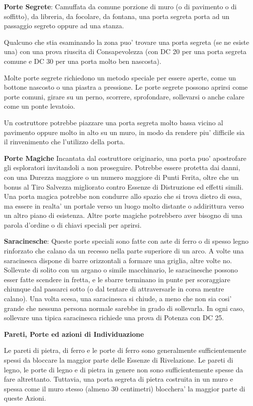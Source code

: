 \documentclass[a4paper,11pt,twoside,openany]{dndbook}
\begin{document}
{\textbf{Porte Segrete}: Camuffata da comune porzione di muro (o di pavimento o di soffitto), da libreria, da focolare, da fontana, una porta segreta porta ad un passaggio segreto oppure ad una stanza.

Qualcuno che stia esaminando la zona puo' trovare una porta segreta (se ne esiste una) con una prova riuscita di Consapevolezza (con DC 20 per una porta segreta comune e DC 30 per una porta molto ben nascosta).

Molte porte segrete richiedono un metodo speciale per essere aperte, come un bottone nascosto o una piastra a pressione. Le porte segrete possono aprirsi come porte comuni, girare su un perno, scorrere, sprofondare, sollevarsi o anche calare come un ponte levatoio.

Un costruttore potrebbe piazzare una porta segreta molto bassa vicino al pavimento oppure molto in alto su un muro, in modo da rendere piu' difficile sia il rinvenimento che l'utilizzo della porta.

\textbf{Porte Magiche} Incantata dal costruttore originario, una porta puo' apostrofare gli esploratori invitandoli a non proseguire. Potrebbe essere protetta dai danni, con una Durezza maggiore o un numero maggiore di Punti Ferita, oltre che un bonus al Tiro Salvezza migliorato contro Essenze di Distruzione ed effetti simili. Una porta magica potrebbe non condurre allo spazio che si trova dietro di essa, ma essere in realta' un portale verso un luogo molto distante o addirittura verso un altro piano di esistenza. Altre porte magiche potrebbero aver bisogno di una parola d'ordine o di chiavi speciali per aprirsi.

\textbf{Saracinesche}: Queste porte speciali sono fatte con aste di ferro o di spesso legno rinforzato che calano da un recesso nella parte superiore di un arco. A volte una saracinesca dispone di barre orizzontali a formare una griglia, altre volte no. Sollevate di solito con un argano o simile macchinario, le saracinesche possono esser fatte scendere in fretta, e le sbarre terminano in punte per scoraggiare chiunque dal passarci sotto (o dal tentare di attraversarle in corsa mentre calano). Una volta scesa, una saracinesca si chiude, a meno che non sia cosi' grande che nessuna persona normale sarebbe in grado di sollevarla. In ogni caso, sollevare una tipica saracinesca richiede una prova di Potenza con DC 25.

\textbf{Pareti, Porte ed azioni di Individuazione}

Le pareti di pietra, di ferro e le porte di ferro sono generalmente sufficientemente spessi da bloccare la maggior parte delle Essenze di Rivelazione. Le pareti di legno, le porte di legno e di pietra in genere non sono sufficientemente spesse da fare altrettanto. Tuttavia, una porta segreta di pietra costruita in un muro e spessa come il muro stesso (almeno 30 centimetri) blocchera' la maggior parte di queste Azioni.

}
\end{document}
